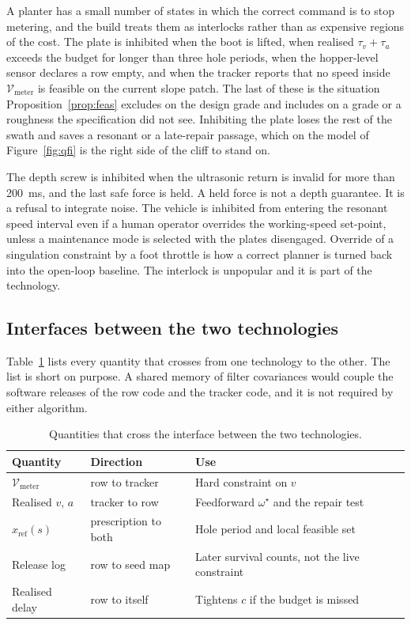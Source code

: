 A planter has a small number of states in which the correct command is to stop metering, and the build treats them as interlocks rather than as expensive regions of the cost. The plate is inhibited when the boot is lifted, when realised \(\tau_v+\tau_a\) exceeds the budget for longer than three hole periods, when the hopper-level sensor declares a row empty, and when the tracker reports that no speed inside \(\mathcal{V}_{\mathrm{meter}}\) is feasible on the current slope patch. The last of these is the situation Proposition~\ref{prop:feas} excludes on the design grade and includes on a grade or a roughness the specification did not see. Inhibiting the plate loses the rest of the swath and saves a resonant or a late-repair passage, which on the model of Figure~\ref{fig:qfi} is the right side of the cliff to stand on.

The depth screw is inhibited when the ultrasonic return is invalid for more than \SI{200}{ms}, and the last safe force is held. A held force is not a depth guarantee. It is a refusal to integrate noise. The vehicle is inhibited from entering the resonant speed interval even if a human operator overrides the working-speed set-point, unless a maintenance mode is selected with the plates disengaged. Override of a singulation constraint by a foot throttle is how a correct planner is turned back into the open-loop baseline. The interlock is unpopular and it is part of the technology.

\subsection{Interfaces between the two technologies}

Table~\ref{tab:iface} lists every quantity that crosses from one technology to the other. The list is short on purpose. A shared memory of filter covariances would couple the software releases of the row code and the tracker code, and it is not required by either algorithm.

\begin{table}[ht]
\centering
\caption{Quantities that cross the interface between the two technologies.}
\label{tab:iface}
\begin{tabularx}{\textwidth}{@{}l l X@{}}
\toprule
Quantity & Direction & Use \\
\midrule
\(\mathcal{V}_{\mathrm{meter}}\) & row to tracker & Hard constraint on \(v\) \\
Realised \(v\), \(a\) & tracker to row & Feedforward \(\omega^{\star}\) and the repair test \\
\(x_{\mathrm{ref}}(s)\) & prescription to both & Hole period and local feasible set \\
Release log & row to seed map & Later survival counts, not the live constraint \\
Realised delay & row to itself & Tightens \(c\) if the budget is missed \\
\bottomrule
\end{tabularx}
\end{table}

